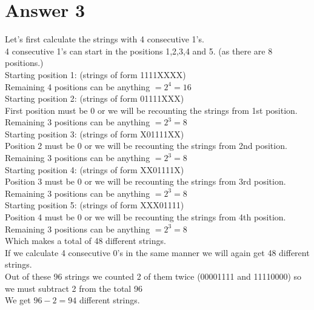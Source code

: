 \documentclass[12pt]{article}
\begin{document}
\section*{Answer 3}
Let's first calculate the strings with 4 consecutive 1's.\\
4 consecutive 1's can start in the positions 1,2,3,4 and 5. (as there are 8 positions.) \\
Starting position 1: (strings of form 1111XXXX)\\
Remaining 4 positions can be anything $ =2^4 = 16$\\
Starting position 2: (strings of form 01111XXX)\\
First position must be 0 or we will be recounting the strings from 1st position.\\
Remaining 3 positions can be anything $ =2^3 = 8$\\
Starting position 3: (strings of form X01111XX)\\
Position 2 must be 0 or we will be recounting the strings from 2nd position.\\
Remaining 3 positions can be anything $ =2^3 = 8$\\
Starting position 4: (strings of form XX01111X)\\
Position 3 must be 0 or we will be recounting the strings from 3rd position.\\
Remaining 3 positions can be anything $ =2^3 = 8$\\
Starting position 5: (strings of form XXX01111)\\
Position 4 must be 0 or we will be recounting the strings from 4th position.\\
Remaining 3 positions can be anything $ =2^3 = 8$\\
Which makes a total of 48 different strings. \\ 
If we calculate 4 consecutive 0's in the same manner we will again get 48 different strings.\\
Out of these 96 strings we counted 2 of them twice (00001111 and 11110000) so we must subtract 2 from the total 96\\
We get $96-2=94$ different strings.
\end{document}
